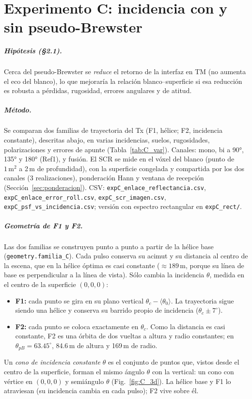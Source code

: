 \chapter{Experimento C: incidencia con y sin pseudo-Brewster}
\label{cap:resC}

\paragraph{Hipótesis (§2.1).} Cerca del pseudo-Brewster se \emph{reduce} el
retorno de la interfaz en TM (no aumenta el eco del blanco), lo que mejoraría
la relación blanco--superficie si esa reducción es robusta a pérdidas,
rugosidad, errores angulares y de atitud.

\paragraph{Método.} Se comparan dos familias de trayectoria del Tx (F1, hélice; F2,
incidencia constante), descritas abajo, en varias incidencias, suelos, rugosidades,
polarizaciones y errores de apunte (Tabla~\ref{tab:C_var}). Canales: mono, bi a 90°, 135°
y 180° (Ref1), y fusión. El SCR se mide en el vóxel del blanco (punto de
$1\,\mathrm{m}^2$ a 2\,m de profundidad), con la superficie congelada y compartida por los
dos canales (3 realizaciones), ponderación Hann y ventana de recepción
(Sección~\ref{sec:ponderacion}). CSV:
\texttt{expC\_enlace\_reflectancia.csv}, \texttt{expC\_enlace\_error\_roll.csv},
\texttt{expC\_scr\_imagen.csv}, \texttt{expC\_psf\_vs\_incidencia.csv}; versión
con espectro rectangular en \texttt{expC\_rect/}.

\paragraph{Geometría de F1 y F2.} Las dos familias se construyen punto a punto a partir de
la hélice base (\texttt{geometry.familia\_C}). Cada pulso conserva su acimut y su distancia al
centro de la escena, que en la hélice óptima es casi constante ($\approx189$\,m, porque su línea
de base es perpendicular a la línea de vista). Sólo cambia la incidencia $\theta$, medida en el
centro de la superficie $(0,0,0)$:
\begin{itemize}[itemsep=1pt]
  \item \textbf{F1:} cada punto se gira en su plano vertical $\theta_c-\langle\theta_0\rangle$. La
  trayectoria sigue siendo una hélice y conserva su barrido propio de incidencia
  ($\theta_c\pm7^{\circ}$).
  \item \textbf{F2:} cada punto se coloca exactamente en $\theta_c$. Como la distancia es casi
  constante, F2 es una órbita de dos vueltas a altura y radio constantes; en
  $\theta_{pB}=63.45^{\circ}$, 84.6\,m de altura y 169\,m de radio.
\end{itemize}
Un \emph{cono de incidencia constante} $\theta$ es el conjunto de puntos que, vistos desde
el centro de la superficie, forman el mismo ángulo $\theta$ con la vertical: un cono con vértice
en $(0,0,0)$ y semiángulo $\theta$ (Fig.~\ref{fig:C_3d}). La hélice base y F1 lo atraviesan
(su incidencia cambia en cada pulso); F2 vive sobre él.

